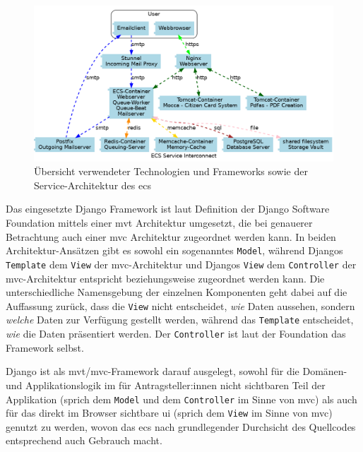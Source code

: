 \documentclass[a4paper,12pt,twoside]{scrreprt}
\begin{document}
\begin{figure}[ht]
    \centering
    \includegraphics[width=\linewidth]{thesis/images/ECS_Service-Architecture.png}
    \caption[Übersicht verwendeter Technologien und Frameworks sowie der Service-Architektur des \acl{ecs}]{Übersicht verwendeter Technologien und Frameworks sowie der Service-Architektur des \acl{ecs} \cite{medizinische_universitat_wien_ecs-handbook_development-2021}}
    \label{fig:ecs-service-architektur}
\end{figure}

Das eingesetzte Django Framework ist laut Definition der Django Software Foundation mittels einer \ac{mvt} Architektur umgesetzt, die bei genauerer Betrachtung auch einer \ac{mvc} Architektur zugeordnet werden kann. In beiden Architektur-Ansätzen gibt es sowohl ein sogenanntes \texttt{Model}, während Djangos \texttt{Template} dem \texttt{View} der \ac{mvc}-Architektur und Djangos \texttt{View} dem \texttt{Controller} der \ac{mvc}-Architektur entspricht beziehungsweise zugeordnet werden kann. Die unterschiedliche Namensgebung der einzelnen Komponenten geht dabei auf die Auffassung zurück, dass die \texttt{View} nicht entscheidet, \textit{wie} Daten aussehen, sondern \textit{welche} Daten zur Verfügung gestellt werden, während das \texttt{Template} entscheidet, \textit{wie} die Daten präsentiert werden. Der \texttt{Controller} ist laut der Foundation das Framework selbst. \cite{django_software_foundation_faq_2023}

\medskip

Django ist als \ac{mvt}/\ac{mvc}-Framework darauf ausgelegt, sowohl für die Domänen- und Applikationslogik im für Antragsteller:innen nicht sichtbaren Teil der Applikation (sprich dem \texttt{Model} und dem \texttt{Controller} im Sinne von \ac{mvc}) als auch für das direkt im Browser sichtbare \ac{ui} (sprich dem \texttt{View} im Sinne von \ac{mvc}) genutzt zu werden, wovon das \ac{ecs} nach grundlegender Durchsicht des Quellcodes entsprechend auch Gebrauch macht. \cite{ethics_commission_system_organization_ecs_2021}
\end{document}
